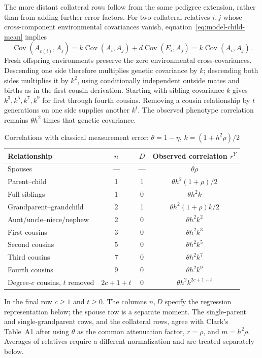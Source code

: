 The more distant collateral rows follow from the same pedigree
extension, rather than from adding further error factors.
For two collateral relatives $i,j$ whose cross-component environmental
covariances vanish, equation~\eqref{eq:model-child-mean} implies
\[
 \operatorname{Cov}(A_{c(i)},A_j)
 =k\operatorname{Cov}(A_i,A_j)+d\operatorname{Cov}(E_i,A_j)
 =k\operatorname{Cov}(A_i,A_j).
\]
Fresh offspring environments preserve the zero environmental
cross-covariances. Descending one side therefore multiplies genetic
covariance by $k$; descending both sides multiplies it by $k^2$,
using conditionally independent outside mates and births as in the
first-cousin derivation. Starting with sibling covariance $k$ gives
$k^3,k^5,k^7,k^9$ for first through fourth cousins. Removing a cousin
relationship by $t$ generations on one side supplies another $k^t$.
The observed phenotype correlation remains $\theta h^2$ times that
genetic covariance.

\begin{table}[htbp]
\centering
\caption{Correlations with classical measurement error:
$\theta=1-\eta$, $k=(1+h^2\rho)/2$}
\label{tab:measurement-moments}
\begin{tabular}{lccc}
\hline
Relationship & $n$ & $D$ & Observed correlation $r^Y$\\
\hline
Spouses & --- & --- & $\theta\rho$\\
Parent--child & 1 & 1 & $\theta h^2(1+\rho)/2$\\
Full siblings & 1 & 0 & $\theta h^2k$\\
Grandparent--grandchild & 2 & 1 & $\theta h^2(1+\rho)k/2$\\
Aunt/uncle--niece/nephew & 2 & 0 & $\theta h^2k^2$\\
First cousins & 3 & 0 & $\theta h^2k^3$\\
Second cousins & 5 & 0 & $\theta h^2k^5$\\
Third cousins & 7 & 0 & $\theta h^2k^7$\\
Fourth cousins & 9 & 0 & $\theta h^2k^9$\\
Degree-$c$ cousins, $t$ removed & $2c+1+t$ & 0
 & $\theta h^2k^{2c+1+t}$\\
\hline
\end{tabular}
\end{table}
In the final row $c\geq1$ and $t\geq0$. The columns $n,D$ specify the
regression representation below; the spouse row is a separate moment.
The single-parent and single-grandparent rows, and the collateral rows,
agree with Clark's Table~A1 after using $\theta$ as the common attenuation factor,
$r=\rho$, and $m=h^2\rho$. Averages of relatives require a different
normalization and are treated separately below.


